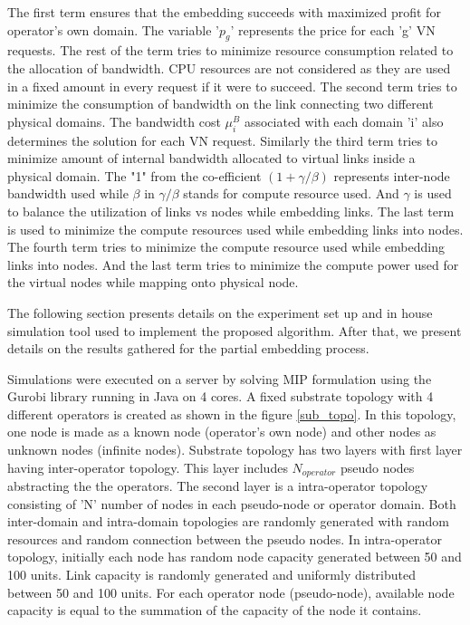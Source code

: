 \documentclass[article,dr=phil,type=msc ,colorback,accentcolor=tud4b]{tudthesis}
\begin{document}
\hspace*{2cm} The first term ensures that the embedding succeeds with maximized profit for operator's own domain. The variable '$p_{g}$' represents the price for each 'g' VN requests. The rest of the term tries to minimize resource consumption related to the allocation of bandwidth. CPU resources are not considered as they are used in a fixed amount in every request if it were to succeed. The second term tries to minimize the consumption of bandwidth on the link connecting two different physical domains. The bandwidth cost $\mu_{i}^{B}$ associated with each domain 'i' also determines the solution for each VN request. Similarly the third term tries to minimize amount of internal bandwidth allocated to virtual links inside a physical domain. The "1" from the co-efficient $(1+\gamma/\beta)$ represents inter-node bandwidth used while $\beta$ in $\gamma/\beta$ stands for compute resource used. And $\gamma$ is used to balance the utilization of links vs nodes while embedding links. The last term is used to minimize the compute
resources used while embedding links into nodes. The fourth term tries to minimize the compute resource used while embedding links into nodes. And the last term tries to minimize the compute power used for the virtual nodes while mapping onto physical node.\newline

The following section presents details on the experiment set up and in house simulation tool used to implement the proposed algorithm. After that, we present details on the results gathered for the partial embedding process. \newline


Simulations were executed on a server by solving MIP formulation using the Gurobi library running in Java on 4 cores. A fixed substrate topology with 4 different operators is created as shown in the figure \ref{sub_topo}. In this topology, one node is made as a known node (operator's own node) and other nodes as unknown nodes (infinite nodes). Substrate topology has two layers with first layer having inter-operator topology. This layer includes $N_{operator}$ pseudo nodes abstracting the the operators. The second layer is a intra-operator topology consisting of 'N' number of nodes in each pseudo-node or operator domain. Both inter-domain and intra-domain topologies are randomly generated with random resources and random connection between the pseudo nodes. In intra-operator topology, initially each node has random node capacity generated between 50 and 100 units. Link capacity is randomly generated and uniformly distributed between 50 and 100 units. For each operator node (pseudo-node), available node capacity is equal to the summation of the capacity of the node it contains. \newline
\end{document}
